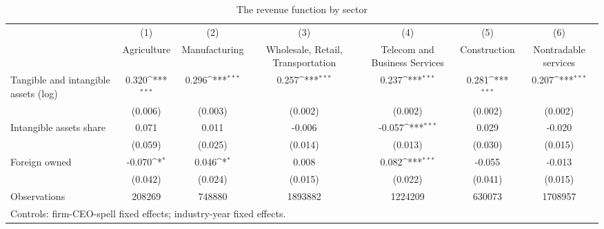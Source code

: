 \begin{table}[htbp]\centering
\def\sym#1{\ifmmode^{#1}\else\(^{#1}\)\fi}
\caption{The revenue function by sector}
\begin{tabular}{l*{6}{c}}
\hline\hline
                    &\multicolumn{1}{c}{(1)}&\multicolumn{1}{c}{(2)}&\multicolumn{1}{c}{(3)}&\multicolumn{1}{c}{(4)}&\multicolumn{1}{c}{(5)}&\multicolumn{1}{c}{(6)}\\
                    &\multicolumn{1}{c}{Agriculture}&\multicolumn{1}{c}{Manufacturing}&\multicolumn{1}{c}{Wholesale, Retail, Transportation}&\multicolumn{1}{c}{Telecom and Business Services}&\multicolumn{1}{c}{Construction}&\multicolumn{1}{c}{Nontradable services}\\
\hline
Tangible and intangible assets (log)&       0.320\sym{***}&       0.296\sym{***}&       0.257\sym{***}&       0.237\sym{***}&       0.281\sym{***}&       0.207\sym{***}\\
                    &     (0.006)         &     (0.003)         &     (0.002)         &     (0.002)         &     (0.002)         &     (0.002)         \\
[1em]
Intangible assets share&       0.071         &       0.011         &      -0.006         &      -0.057\sym{***}&       0.029         &      -0.020         \\
                    &     (0.059)         &     (0.025)         &     (0.014)         &     (0.013)         &     (0.030)         &     (0.015)         \\
[1em]
Foreign owned       &      -0.070\sym{*}  &       0.046\sym{*}  &       0.008         &       0.082\sym{***}&      -0.055         &      -0.013         \\
                    &     (0.042)         &     (0.024)         &     (0.015)         &     (0.022)         &     (0.041)         &     (0.015)         \\
\hline
Observations        &      208269         &      748880         &     1893882         &     1224209         &      630073         &     1708957         \\
\hline\hline
\multicolumn{7}{l}{\footnotesize Controls: firm-CEO-spell fixed effects; industry-year fixed effects.}\\
\end{tabular}
\end{table}
